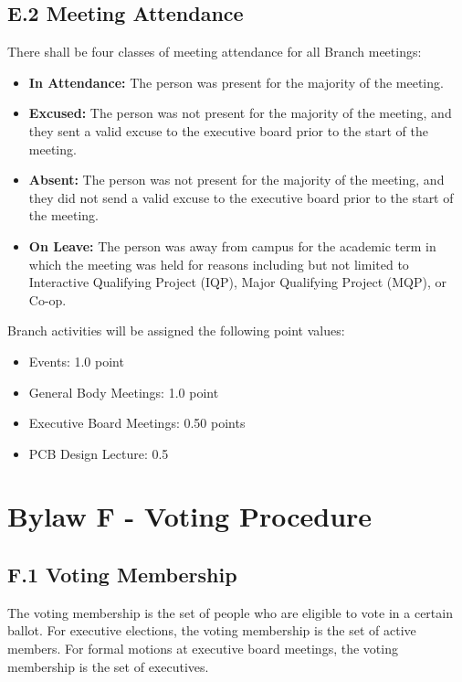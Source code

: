 \documentclass[11pt,a4paper]{article}
\begin{document}
\subsection*{E.2 Meeting Attendance}
\label{E.2}
There shall be four classes of meeting attendance for all Branch meetings:
\begin{itemize}[noitemsep]
    \item \textbf{In Attendance:} The person was present for the majority of the meeting.
    \item \textbf{Excused:} The person was not present for the majority of the meeting, and they sent a valid excuse to the executive board prior to the start of the meeting.
    \item \textbf{Absent:} The person was not present for the majority of the meeting, and they did not send a valid excuse to the executive board prior to the start of the meeting.
    \item \textbf{On Leave:} The person was away from campus for the academic term in which the meeting was held for reasons including but not limited to Interactive Qualifying Project (IQP), Major Qualifying Project (MQP), or Co-op.
\end{itemize}
Branch activities will be assigned the following point values:
\begin{itemize}[noitemsep]
    \item Events: 1.0 point
    \item General Body Meetings: 1.0 point
    \item Executive Board Meetings: 0.50 points
    \item PCB Design Lecture: 0.5
\end{itemize}

\section*{Bylaw F - Voting Procedure}

\subsection*{F.1 Voting Membership}
The voting membership is the set of people who are eligible to vote in a certain ballot. For executive elections, the voting membership is the set of active members. For formal motions at executive board meetings, the voting membership is the set of executives.
\end{document}
